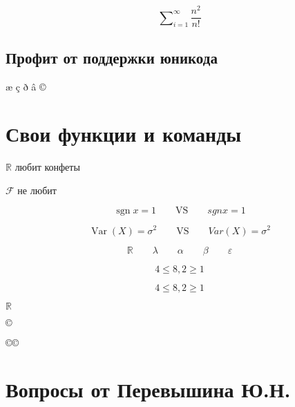 \documentclass[12pt, a4paper]{article}
\DeclareMathOperator{\sgn}{sgn}
\DeclareMathOperator{\Var}{Var}
\begin{document}
\[ \sum\nolimits_{i=1}^{\infty} \frac{n^2}{n!} \]




\subsection{Профит от поддержки юникода}

æ ç ð â ©


\section{Свои функции и команды}

\def\R{\ensuremath{\mathbb{R}}}

\def\F{\ensuremath{\mathcal{F}}{ }}

\R{ } любит конфеты  

\F не любит


\def \a{\alpha}
\def \b{\beta}
\def \la{\lambda}
\def \sg{\sigma}
\def \e{\varepsilon}

\[\sgn  x = 1 \qquad \text{VS} \qquad sgn x = 1\]

\[\Var(X) = \sigma^2 \qquad \text{VS} \qquad Var(X) = \sigma^2\]

\[ \R \qquad \la \qquad \a \qquad \b \qquad \e \]

\[ 4 \le 8, 2 \ge 1\]


\renewcommand{\le}{\leqslant}
\renewcommand{\ge}{\geqslant}

\[ 4 \le 8, 2 \ge 1\]


\R

\def \ccc{©}

\newcommand{\сс}{©}

$ \ccc $

\сс   $\сс$

\section{Вопросы от Перевышина Ю.Н.}
\end{document}
